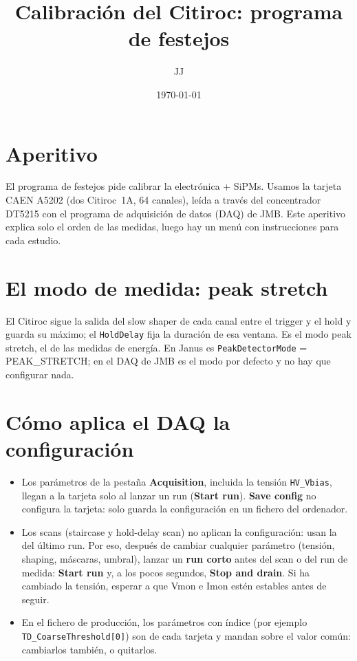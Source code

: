 \documentclass[11pt,a4paper]{article}
\title{Calibración del Citiroc: programa de festejos}
\author{JJ}
\date{\today}
\begin{document}
\maketitle

\section*{Aperitivo}

El programa de festejos pide calibrar la electrónica + SiPMs. Usamos la tarjeta CAEN A5202 (dos Citiroc~1A, 64 canales), leída a través del concentrador DT5215 con el programa de
adquisición de datos (DAQ) de JMB. Este aperitivo explica
solo el orden de las medidas, luego hay un menú con instrucciones para cada estudio.  

\section*{El modo de medida: peak stretch}

El Citiroc sigue la salida del slow shaper de cada canal entre el trigger y
el hold y guarda su máximo; el \texttt{HoldDelay} fija la duración de esa
ventana. Es el modo peak stretch, el de las medidas de energía. En Janus es
\texttt{PeakDetectorMode} = PEAK\_STRETCH; en el DAQ de JMB es el modo por
defecto y no hay que configurar nada.

\section*{Cómo aplica el DAQ la configuración}

\begin{itemize}
\item Los parámetros de la pestaña {\bf Acquisition}, incluida la tensión
  \texttt{HV\_Vbias}, llegan a la tarjeta solo al lanzar un run ({\bf Start
  run}). {\bf Save config} no configura la tarjeta: solo guarda la
  configuración en un fichero del ordenador.
\item Los scans (staircase y hold-delay scan) no aplican la configuración:
  usan la del último run. Por eso, después de cambiar cualquier parámetro
  (tensión, shaping, máscaras, umbral), lanzar un {\bf run corto} antes del
  scan o del run de medida: {\bf Start run} y, a los pocos segundos,
  {\bf Stop and drain}. Si ha cambiado la tensión, esperar a que Vmon e
  Imon estén estables antes de seguir.
\item \sloppy En el fichero de producción, los parámetros con índice (por ejemplo
  \texttt{TD\_CoarseThreshold[0]}) son de cada tarjeta y mandan sobre el
  valor común: cambiarlos también, o quitarlos.
\end{itemize}
\end{document}
